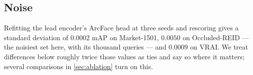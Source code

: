\subsection{Noise}
Refitting the lead encoder's ArcFace head at three seeds and rescoring gives a standard
deviation of $0.0002$ mAP on Market-1501, $0.0050$ on Occluded-REID --- the noisiest set here,
with its thousand queries --- and $0.0009$ on VRAI. We treat differences below roughly twice
those values as ties and say so where it matters; several comparisons in \cref{sec:ablation}
turn on this.
